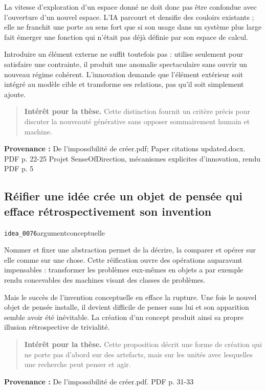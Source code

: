 \documentclass[10pt,a4paper]{article}
\begin{document}
La vitesse d'exploration d'un espace donné ne doit donc pas être confondue avec l'ouverture d'un nouvel espace. L'IA parcourt et densifie des couloirs existants ; elle ne franchit une porte au sens fort que si son usage dans un système plus large fait émerger une fonction qui n'était pas déjà définie par son espace de calcul.

Introduire un élément externe ne suffit toutefois pas : utilise seulement pour satisfaire une contrainte, il produit une anomalie spectaculaire sans ouvrir un nouveau régime cohérent. L'innovation demande que l'élément extérieur soit intégré au modèle cible et transforme ses relations, pas qu'il soit simplement ajoute.

\begin{quote}
\textbf{Intérêt pour la thèse.} Cette distinction fournit un critère précis pour discuter la nouveauté générative sans opposer sommairement humain et machine.
\end{quote}
{\footnotesize\color{metadata}\textbf{Provenance :} De l'impossibilité de créer.pdf; Paper citations updated.docx. PDF p. 22-25 Projet SenseOfDirection, mécanismes explicites d'innovation, rendu PDF p. 5\par}

\subsection{Réifier une idée crée un objet de pensée qui efface rétrospectivement son invention}
{\small\color{metadata} \texttt{idea\_0076}\quad\textbullet\quad argument\quad\textbullet\quad conceptuelle\par}

Nommer et fixer une abstraction permet de la décrire, la comparer et opérer sur elle comme sur une chose. Cette réification ouvre des opérations auparavant impensables : transformer les problèmes eux-mêmes en objets a par exemple rendu concevables des machines visant des classes de problèmes.

Mais le succès de l'invention conceptuelle en efface la rupture. Une fois le nouvel objet de pensée installe, il devient difficile de penser sans lui et son apparition semble avoir été inévitable. La création d'un concept produit ainsi sa propre illusion rétrospective de trivialité.

\begin{quote}
\textbf{Intérêt pour la thèse.} Cette proposition décrit une forme de création qui ne porte pas d'abord sur des artefacts, mais sur les unités avec lesquelles une recherche peut penser et agir.
\end{quote}
{\footnotesize\color{metadata}\textbf{Provenance :} De l'impossibilité de créer.pdf. PDF p. 31-33\par}
\end{document}
